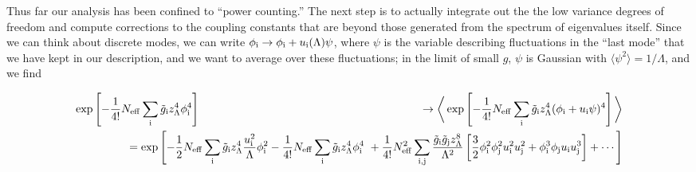 \documentclass[aps,twocolumn,floats,nofootinbib,prl]{revtex4}
\begin{document}
Thus far our analysis has been confined to ``power counting.''  The next step is to actually integrate out the the low variance degrees of freedom and compute corrections to the coupling constants that are beyond those generated from the spectrum of eigenvalues itself.  Since we can think about discrete modes, we can write $\phi_{\rm i} \rightarrow \phi_{\rm i} + u_{\rm i}(\Lambda)  \psi$, where $\psi$ is the variable describing fluctuations in the ``last mode'' that we have kept in our description, and we want to average over these fluctuations;  in the limit of small $g$,  $\psi$ is Gaussian with $\langle \psi^2\rangle = 1/\Lambda$, and we find
\begin{widetext}
\begin{eqnarray}
\exp\left[ - \frac{1}{4!} N_{\rm eff} \sum_{\rm i} \tilde g_{\rm i}z_\Lambda^4 \phi_{\rm i}^4\right]
&&\rightarrow 
{\bigg\langle}\exp\left[ - \frac{1}{4!} N_{\rm eff} \sum_{\rm i} \tilde g_{\rm i}z_\Lambda^4 (\phi_{\rm i} + u_{\rm i}  \psi)^4\right]{\bigg\rangle}\\
&&\hskip -1in =  \exp\left[ - \frac{1}{2} N_{\rm eff} \sum_{\rm i} \tilde g_{\rm i}z_\Lambda^4 {{u_{\rm i}^2 }\over \Lambda} \phi_{\rm i}^2
 - \frac{1}{4!} N_{\rm eff} \sum_{\rm i} \tilde g_{\rm i}z_\Lambda^4 \phi_{\rm i}^4\
 + \frac{1}{4!} N_{\rm eff}^2 \sum_{{\rm i},{\rm j}} \frac{\tilde g_{\rm i}\tilde g_{\rm j}z_\Lambda^8}{\Lambda^2}  \left[ \frac{3}{2}\phi_{\rm i}^2 \phi_{\rm j}^2 u_{\rm i}^2 u_{\rm j}^2 + \phi_{\rm i}^3 \phi_{\rm j} u_{\rm i} u_{\rm j}^3\right] + \cdots \right] \nonumber\\
 &&
\end{eqnarray}
\end{widetext}
\end{document}
